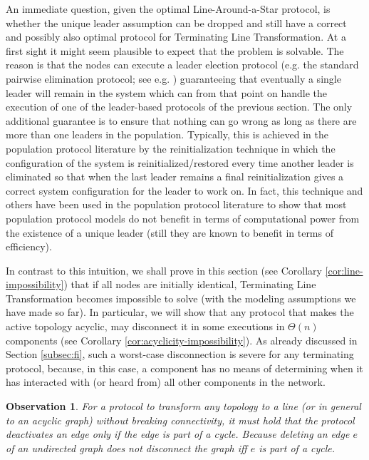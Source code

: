 \documentclass[preprint]{elsarticle}
\newtheorem{observation}{Observation}
\begin{document}
An immediate question, given the optimal Line-Around-a-Star protocol, is whether the unique leader assumption can be dropped and still have a correct and possibly also optimal protocol for Terminating Line Transformation. At a first sight it might seem plausible to expect that the problem is solvable. The reason is that the nodes can execute a leader election protocol (e.g. the standard pairwise elimination protocol; see e.g. \cite{AR09}) guaranteeing that eventually a single leader will remain in the system which can from that point on handle the execution of one of the leader-based protocols of the previous section. The only additional guarantee is to ensure that nothing can go wrong as long as there are more than one leaders in the population. Typically, this is achieved in the population protocol literature by the reinitialization technique in which the configuration of the system is reinitialized/restored every time another leader is eliminated so that when the last leader remains a final reinitialization gives a correct system configuration for the leader to work on. In fact, this technique and others have been used in the population protocol literature to show that most population protocol models do not benefit in terms of computational power from the existence of a unique leader (still they are known to benefit in terms of efficiency). 

In contrast to this intuition, we shall prove in this section (see Corollary \ref{cor:line-impossibility}) that if all nodes are initially identical, Terminating Line Transformation becomes impossible to solve (with the modeling assumptions we have made so far). In particular, we will show that any protocol that makes the active topology acyclic, may disconnect it in some executions in $\Theta(n)$ components (see Corollary \ref{cor:acyclicity-impossibility}). As already discussed in Section \ref{subsec:fi}, such a worst-case disconnection is severe for any terminating protocol, because, in this case, a component has no means of determining when it has interacted with (or heard from) all other components in the network.  

\begin{observation}
For a protocol to transform any topology to a line (or in general to an acyclic graph) without breaking connectivity, it must hold that the protocol deactivates an edge only if the edge is part of a cycle. Because deleting an edge $e$ of an undirected graph does
not disconnect the graph iff $e$ is part of a cycle.
\end{observation}
\end{document}
